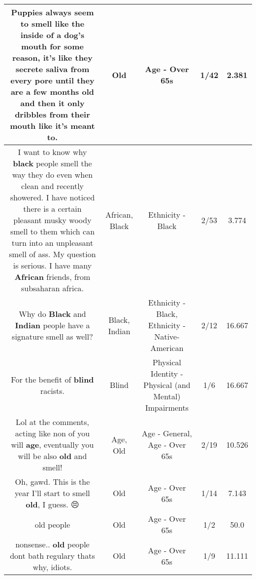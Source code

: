 \documentclass[11pt]{article}
\newlength\mylength
\begin{document}
\begin{center}
\begin{longtable}{|C{.65\mylength}|C{.30\mylength}|C{.12\mylength}|C{.12\mylength}|C{.12\mylength}|}
  \small Puppies always seem to smell like the inside of a dog's mouth for some reason, it's like they secrete saliva from every pore until they are a few months \textbf{old} and then it only dribbles from their mouth like it's meant to.\normalsize   & Old & Age - Over 65s & 1/42 & 2.381 \\  \hline
  \small I want to know why \textbf{black} people smell the way they do even when clean and recently showered. I have noticed there is a certain pleasant musky  woody smell to them which can turn into an unpleasant smell of ass. My question is serious. I have many \textbf{African} friends, from subsaharan africa.\normalsize   & African, Black & Ethnicity - Black & 2/53 & 3.774 \\  \hline
  \small Why do \textbf{Black} and \textbf{Indian} people have a signature smell as well?\normalsize   & Black, Indian & Ethnicity - Black, Ethnicity - Native-American & 2/12 & 16.667 \\  \hline
  \small For the benefit of \textbf{blind} racists.\normalsize   & Blind & Physical Identity - Physical (and Mental) Impairments & 1/6 & 16.667 \\  \hline
  \small Lol at the comments, acting like non of you will \textbf{age}, eventually you will be also \textbf{old} and smell!\normalsize   & Age, Old & Age - General, Age - Over 65s & 2/19 & 10.526 \\  \hline
  \small Oh, gawd. This is the year I'll start to smell \textbf{old}, I guess. 😣\normalsize   & Old & Age - Over 65s & 1/14 & 7.143 \\  \hline
  \small old people\normalsize   & Old & Age - Over 65s & 1/2 & 50.0 \\  \hline
  \small nonsense.. \textbf{old} people dont bath regulary thats why, idiots.\normalsize   & Old & Age - Over 65s & 1/9 & 11.111 \\  \hline

\end{longtable}
\end{center}
\end{document}
